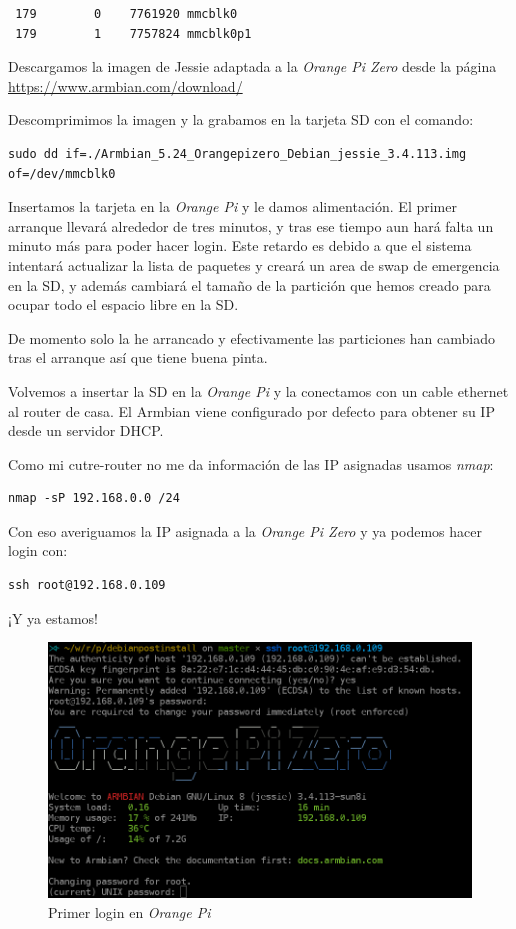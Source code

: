 \documentclass[12pt,spanish,]{article}
\begin{document}
\begin{verbatim}
 179        0    7761920 mmcblk0
 179        1    7757824 mmcblk0p1
\end{verbatim}

Descargamos la imagen de Jessie adaptada a la \emph{Orange Pi Zero}
desde la página \url{https://www.armbian.com/download/}

Descomprimimos la imagen y la grabamos en la tarjeta SD con el comando:

\begin{verbatim}
sudo dd if=./Armbian_5.24_Orangepizero_Debian_jessie_3.4.113.img of=/dev/mmcblk0
\end{verbatim}

Insertamos la tarjeta en la \emph{Orange Pi} y le damos alimentación. El
primer arranque llevará alrededor de tres minutos, y tras ese tiempo aun
hará falta un minuto más para poder hacer login. Este retardo es debido
a que el sistema intentará actualizar la lista de paquetes y creará un
area de swap de emergencia en la SD, y además cambiará el tamaño de la
partición que hemos creado para ocupar todo el espacio libre en la SD.

De momento solo la he arrancado y efectivamente las particiones han
cambiado tras el arranque así que tiene buena pinta.

Volvemos a insertar la SD en la \emph{Orange Pi} y la conectamos con un
cable ethernet al router de casa. El Armbian viene configurado por
defecto para obtener su IP desde un servidor DHCP.

Como mi cutre-router no me da información de las IP asignadas usamos
\emph{nmap}:

\begin{verbatim}
nmap -sP 192.168.0.0 /24
\end{verbatim}

Con eso averiguamos la IP asignada a la \emph{Orange Pi Zero} y ya
podemos hacer login con:

\begin{verbatim}
ssh root@192.168.0.109
\end{verbatim}

¡Y ya estamos!

\begin{figure}[htbp]
\centering
\includegraphics{src/img/OrangePiZero_FirstLogin.png}
\caption{Primer login en \emph{Orange Pi}}
\end{figure}
\end{document}

